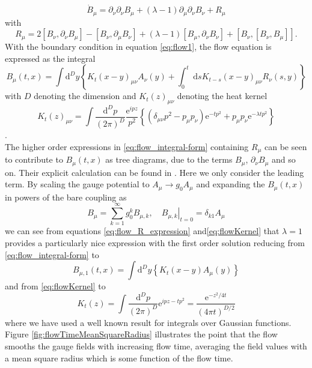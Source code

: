\documentclass[a4paper,10pt]{article}
\begin{document}
\begin{equation}
\dot{B}_{\mu}=\partial_{\nu} \partial_{\nu} B_{\mu}+\left(\lambda-1\right) \partial_{\mu} \partial_{\nu} B_{\nu}+R_{\mu}
\end{equation}
with 
\begin{equation}\label{eq:flow_R_expression}
R_{\mu}=2\left[B_{\nu}, \partial_{\nu} B_{\mu}\right]-\left[B_{\nu}, \partial_{\mu} B_{\nu}\right]+\left(\lambda-1\right)\left[B_{\mu}, \partial_{\nu} B_{\nu}\right]+\left[B_{\nu},\left[B_{\nu}, B_{\mu}\right]\right].
\end{equation}
With the boundary condition in equation \eqref{eq:flow1}, the flow equation is expressed as the integral
\begin{equation}\label{eq:flow_integral-form}
B_{\mu}(t, x)=\int \mathrm{d}^{D} y\left\{K_{t}(x-y)_{\mu \nu} A_{\nu}(y)+\int_{0}^{t} \mathrm{~d} s K_{t-s}(x-y)_{\mu \nu} R_{\nu}(s, y)\right\}
\end{equation}
with $D$ denoting the dimension and $K_{t}(z)_{\mu \nu}$ denoting the heat kernel
\begin{equation}\label{eq:flowKernel}
K_{t}(z)_{\mu \nu} = \int \frac{\mathrm{d}^{D} p}{(2 \pi)^{D}}\frac{\mathrm{e}^{i p z}}{p^{2}}\left\{\left(\delta_{\mu \nu} p^{2}-p_{\mu} p_{\nu}\right) \mathrm{e}^{-t p^{2}}+p_{\mu} p_{\nu} \mathrm{e}^{-\lambda t p^{2}}\right\}
\end{equation}
\cite{L_scher_2011}.\\The higher order expressions in \eqref{eq:flow_integral-form} containing $R_\mu$ can be seen to contribute to $B_\mu (t,x)$ as tree diagrams, due to the terms $B_\mu$, $\partial_\nu B_\mu$ and so on. Their explicit calculation can be found in \cite{L_scher_2011}. Here we only consider the leading term. By scaling the gauge potential to $A_{\mu} \rightarrow g_{0} A_{\mu}$ and expanding the $B_\mu(t,x)$ in powers of the bare coupling as
\begin{equation}\label{eq:flow_g_0expansion}
B_{\mu}=\sum_{k=1}^{\infty} g_{0}^{k} B_{\mu, k},\left.\quad B_{\mu, k}\right|_{t=0}=\delta_{k 1} A_{\mu}
\end{equation}
we can see from equations \eqref{eq:flow_R_expression} and\eqref{eq:flowKernel} that $\lambda = 1$ provides a particularly nice expression with the first order solution reducing from \eqref{eq:flow_integral-form} to 
\begin{equation}
B_{\mu,1}(t, x)=\int \mathrm{d}^{D} y\left\{K_{t}(x-y) A_{\mu}(y)\right\}
\end{equation}
and from \eqref{eq:flowKernel} to 
\begin{equation}
K_{t}(z) = \int \frac{\mathrm{d}^{D} p}{(2 \pi)^{D}}\mathrm{e}^{i p z-t p^{2}} = \frac{\mathrm{e}^{-z^{2} / 4 t}}{(4 \pi t)^{D / 2}}
\end{equation}
where we have used a well known result for integrals over Gaussian functions.\\Figure \ref{fig:flowTimeMeanSquareRadius} illustrates the point that the flow smooths the gauge fields with increasing flow time, averaging the field values with a mean square radius which is some function of the flow time.  
\end{document}
